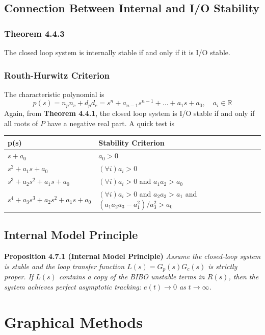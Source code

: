 \documentclass[letterpaper,12pt]{article}
\begin{document}
\subsection{Connection Between Internal and I/O Stability}
\subsubsection{Theorem 4.4.3}
The closed loop system is internally stable if and only if it is I/O stable.
\subsubsection{Routh-Hurwitz Criterion}
The characteristic polynomial is
\begin{equation*}
    p(s) = n_p n_c + d_p d_c = s^n + a_{n-1}s^{n-1} + \dots + a_1 s + a_0, \quad a_i \in \mathbb{R}
\end{equation*}
Again, from \textbf{Theorem 4.4.1}, the closed loop system is I/O stable if and only if all roots of $P$ have a negative real part. A quick test
is 
\begin{table}[h]
    \centering
    \begin{tabular}{ll}
        p(s) & Stability Criterion \\
        \hline
        $s + a_0$ & $a_0 > 0$ \\
        $s^2 + a_1 s + a_0$ & $(\forall i) a_i > 0$ \\
        $s^3 + a_2 s^2 + a_1 s + a_0$ & $(\forall i) a_i > 0$ and $a_1 a_2 > a_0$ \\
        $s^4 + a_3 s^3 + a_2 s^2 + a_1 s + a_0$ & $(\forall i) a_i > 0$ and $a_2 a_3 > a_1$ and $(a_1 a_2 a_3 - a_{1}^2)/a_{3}^2 > a_0$
    \end{tabular}
\end{table}

\subsection{Internal Model Principle}
\textbf{Proposition 4.7.1 (Internal Model Principle)} \textit{
Assume the closed-loop system is stable and the loop transfer function
$L(s) = G_p(s) G_c(s)$ is strictly proper. If $L(s)$ contains a copy of the 
BIBO unstable terms in $R(s)$, then the system achieves perfect asymptotic 
tracking: $e(t) \to 0$ as $t \to \infty$.}

\section{Graphical Methods}
\end{document}

